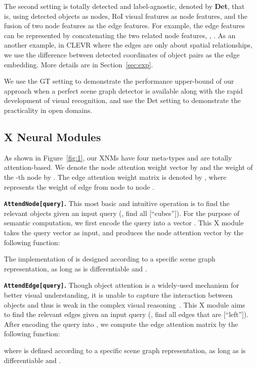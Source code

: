 \documentclass[10pt,twocolumn,letterpaper]{article}
\begin{document}
The second setting is totally detected and label-agnostic, denoted by \textbf{Det}, that is, using detected objects as nodes, RoI visual features as node features, and the fusion of two node features as the edge features.
For example, the edge features can be represented by concatenating the two related node features, \ie, . As an another example, in CLEVR where the edges are only about spatial relationships, we use the difference between detected coordinates of object pairs as the edge embedding. More details are in Section~\ref{sec:exp}.

We use the GT setting to demonstrate the performance upper-bound of our approach when a perfect scene graph detector is available along with the rapid development of visual recognition, and use the Det setting to demonstrate the practicality in open domains.


\subsection{X Neural Modules}
As shown in Figure~\ref{fig:1}, our XNMs have four meta-types and are totally attention-based. 
We denote the node attention weight vector by  and the weight of the -th node by .
The edge attention weight matrix is denoted by , where  represents the weight of edge from node  to node .

\textbf{\texttt{AttendNode[query]}.}
This most basic and intuitive operation is to find the relevant objects given an input query (\eg, find all [``cubes'']).
For the purpose of semantic computation, we first encode the query into a vector .
This X module takes the query vector as input, and produces the node attention vector by the following function:

The implementation of  is designed according to a specific scene graph representation, as long as  is differentiable and .


\textbf{\texttt{AttendEdge[query]}.}
Though object attention is a widely-used mechanism for better visual understanding, it is unable to capture the interaction between objects and thus is weak in the complex visual reasoning~\cite{zhang2018count}.
This X module aims to find the relevant edges given an input query (\eg, find all edges that are [``left'']).
After encoding the query into , we compute the edge attention matrix by the following function:

where  is defined according to a specific scene graph representation, as long as  is differentiable and .
\end{document}
